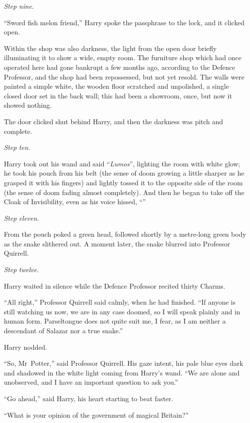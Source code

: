\emph{Step nine.}

“Sword fish melon friend,” Harry spoke the passphrase to the lock, and it clicked open.

Within the shop was also darkness, the light from the open door briefly illuminating it to show a wide, empty room. The furniture shop which had once operated here had gone bankrupt a few months ago, according to the Defence Professor, and the shop had been repossessed, but not yet resold. The walls were painted a simple white, the wooden floor scratched and unpolished, a single closed door set in the back wall; this had been a showroom, once, but now it showed nothing.

The door clicked shut behind Harry, and then the darkness was pitch and complete.

\emph{Step ten.}

Harry took out his wand and said “\emph{Lumos}”, lighting the room with white glow; he took his pouch from his belt (the sense of doom growing a little sharper as he grasped it with his fingers) and lightly tossed it to the opposite side of the room (the sense of doom fading almost completely). And then he began to take off the Cloak of Invisibility, even as his voice hissed, “”

\emph{Step eleven.}

From the pouch poked a green head, followed shortly by a metre-long green body as the snake slithered out. A moment later, the snake blurred into Professor Quirrell.

\emph{Step twelve.}

Harry waited in silence while the Defence Professor recited thirty Charms.

“All right,” Professor Quirrell said calmly, when he had finished.
“If anyone is still watching us now, we are in any case doomed, so I will speak plainly and in human form. Parseltongue does not quite suit me, I fear, as I am neither a descendant of Salazar nor a true snake.”

Harry nodded.

“So, Mr~Potter,” said Professor Quirrell. His gaze intent, his pale blue eyes dark and shadowed in the white light coming from Harry’s wand.
“We are alone and unobserved, and I have an important question to ask you.”

“Go ahead,” said Harry, his heart starting to beat faster.

“What is your opinion of the government of magical Britain?”

